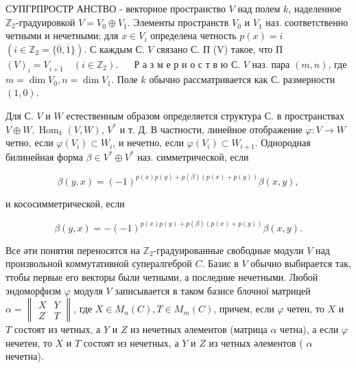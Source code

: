 \documentclass[10pt]{article}
\begin{document}
СУПГРПРОСТР АНСТВО - векторное пространство $V$ над полем $k$, наделенное $\mathbb{Z}_{2}$-градуировкой $V=V_{\overline{0}} \oplus V_{\overline{1}}$. Элементы пространств $V_{\overline{0}}$ и $V_{\overline{1}}$ наз. соответственно четными и нечетными; для $x \in V_{i}$ определена четность $p(x)=i$ $\left(i \in \mathbb{Z}_{2}=\{\overline{0}, \overline{1}\}\right)$. С каждым С. $V$ связано С. П (V) такое, что П $(V)_{i}=V_{i+\overline{1}} \quad\left(i \in \mathbb{Z}_{2}\right)$. $\quad$ Р а з м е р н о с т в ю С. $V$ наз. пара $(m, n)$, где $m=\operatorname{dim} V_{\overline{0}}, n=\operatorname{dim} V_{\overline{1}}$. Поле $k$ обычно рассматривается как С. размерности $(1,0)$.



Для С. $V$ и $W$ естественным образом определяется структура С. в пространствах $V \oplus W, \operatorname{Hom}_{k}(V, W)$, $V^{*}$ и т. Д. В частности, линейное отображение $\varphi: V \rightarrow W$ четно, если $\varphi\left(V_{i}\right) \subset W_{i}$, и нечетно, если $\varphi\left(V_{i}\right) \subset W_{i+1}$. Однородная билинейная форма $\beta \in V^{*} \oplus V^{*}$ наз. симметрической, если



\[

\beta(y, x)=(-1)^{p(x) p(y)+p(\beta)(p(x)+p(y))} \beta(x, y),

\]



и кососимметрической, если



\[

\beta(y, x)=-(-1)^{p(x) p(y)+p(\beta)(p(x)+p(y))} \beta(x, y) .

\]



Все әти понятия переносятся на $\mathbb{Z}_{2}$-градуированные свободные модули $V$ над произвольной коммутативной супералгеброй $C$. Базис в $V$ обычно выбирается так, ттобы первые его векторы были четными, а последние нечетными. Любой эндоморфизм $\varphi$ модуля $V$ записывается в таком базисе блочної матрицей $\alpha=\left\|\begin{array}{ll}X & Y \\ Z & T\end{array}\right\|$, где $X \in M_{n}(C), T \in M_{m}(C)$, причем, если $\varphi$ четен, то $X$ и $T$ состоят из четных, а $Y$ и $Z$ из нечетных әлементов (матрица $\alpha$ четна), а если $\varphi$ нечетен, то $X$ и $T$ состоят из нечетных, а $Y$ и $Z$ из четных әлементов ( $\alpha$ нечетна).
\end{document}
